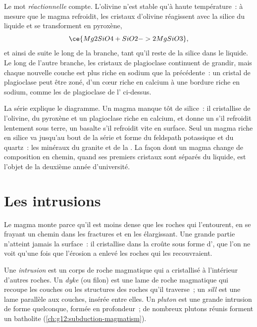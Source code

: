 Le mot \emph{réactionnelle} compte. L'olivine n'est stable qu'à haute
température~: à mesure que le magma refroidit, les cristaux d'olivine
réagissent avec la silice du liquide et se transforment en pyroxène,
\[
  \ce{Mg2SiO4 + SiO2 -> 2 MgSiO3},
\]
et ainsi de suite le long de la branche, tant qu'il reste de la silice dans
le liquide. Le long de l'autre branche, les cristaux de plagioclase
continuent de grandir, mais chaque nouvelle couche est plus riche en sodium
que la précédente~: un cristal de plagioclase peut être zoné, d'un cœur
riche en calcium à une bordure riche en sodium, comme les  de
plagioclase de l' ci-dessus.

La série explique le diagramme. Un magma  manque tôt de silice~: il
cristallise de l'olivine, du pyroxène et un plagioclase riche en calcium, et
donne un  s'il refroidit lentement sous terre, un basalte s'il
refroidit vite en surface. Seul un magma riche en silice va jusqu'au bout de
la série et forme du feldspath potassique et du quartz~: les minéraux du
granite et de la . La façon dont un magma change de composition en
chemin, quand ses premiers cristaux sont séparés du liquide, est l'objet de
la deuxième année d'université.

\section{Les intrusions}

Le magma monte parce qu'il est moins dense que les roches qui l'entourent,
en se frayant un chemin dans les fractures et en les élargissant. Une
grande partie n'atteint jamais la surface~: il cristallise dans la croûte
sous forme d', que l'on ne voit qu'une fois que l'érosion a
enlevé les roches qui les recouvraient.

\begin{definition}\label{def:g11:igneous-rocks:intrusion}
Une \emph{intrusion} est un corps de roche magmatique qui a
cristallisé à l'intérieur d'autres roches. Un \emph{dyke} (ou
filon) est une lame de roche magmatique qui recoupe les couches ou les
structures des roches qu'il traverse~; un \emph{sill} est une
lame parallèle aux couches, insérée entre elles. Un
\emph{pluton} est une grande intrusion de forme quelconque,
formée en profondeur~; de nombreux plutons réunis forment un batholite
(\cref{ch:g12:subduction-magmatism}).
\end{definition}

